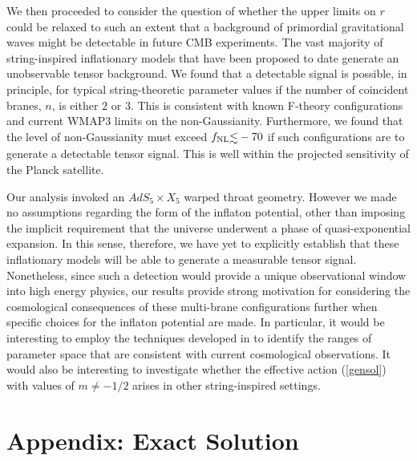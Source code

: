 {We then proceeded to consider the question of whether the upper limits on 
$r$ could be relaxed to such an extent 
that a background of primordial gravitational waves 
might be detectable in future CMB experiments. The vast majority of 
string-inspired inflationary models that have been proposed to date 
generate an unobservable tensor background. We 
found that a detectable signal is possible, in principle, 
for typical string-theoretic parameter values 
if the number of coincident branes, $n$, is either $2$ or $3$. 
This is consistent with known F-theory configurations and 
current WMAP3 limits on the non-Gaussianity. Furthermore, 
we found that the level of non-Gaussianity must exceed $\fnl 
\lsim -70$ if such configurations are to generate a detectable tensor 
signal. This is well within the projected sensitivity 
of the Planck satellite.   

Our analysis invoked an $AdS_5 \times X_5$ warped throat geometry. However we 
made no assumptions regarding the form of the inflaton potential, other 
than imposing the implicit requirement that the universe underwent a phase of 
quasi-exponential expansion. In this sense, therefore, we have 
yet to explicitly establish that these inflationary models will 
be able to generate a measurable tensor signal. 
Nonetheless, since such a detection would provide a unique observational 
window into high energy physics, our results 
provide strong motivation for considering the cosmological consequences 
of these multi-brane configurations further when specific choices for the 
inflaton potential are made. In particular, it would be interesting 
to employ the techniques developed in
\cite{bean,Peiris:2007gz,Lorenz:2007ze,Bean:2007eh,Bean:2008ga} 
to identify the ranges of parameter space that are consistent 
with current cosmological observations. It would also be interesting to 
investigate whether the effective action (\ref{gensol}) with values of 
$m \ne - 1/2$ arises in other string-inspired settings. 



\section*{Appendix: Exact Solution}
\label{sec:multi-appendix}

}
